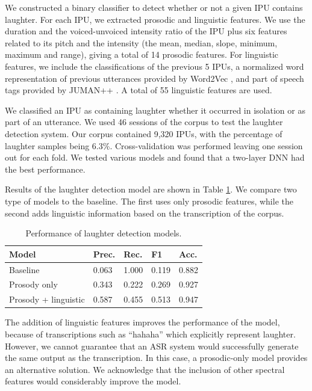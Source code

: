 \documentclass[letterpaper]{article} %
\begin{document}
We constructed a binary classifier to detect whether or not a given IPU contains laughter. For each IPU, we extracted prosodic and linguistic features. We use the duration and the voiced-unvoiced intensity ratio of the IPU plus six features related to its pitch and the intensity (the mean, median, slope, minimum, maximum and range), giving a total of 14 prosodic features. For linguistic features, we include the classifications of the previous 5 IPUs, a normalized word representation of previous utterances provided by Word2Vec \cite{Mikolov2013}, and part of speech tags provided by JUMAN++ \cite{Morita2015}. A total of 55 linguistic features are used.

We classified an IPU as containing laughter whether it occurred in isolation or as part of an utterance. We used 46 sessions of the corpus to test the laughter detection system. Our corpus contained 9,320 IPUs, with the percentage of laughter samples being 6.3\%. Cross-validation was performed leaving one session out for each fold. We tested various models and found that a two-layer DNN had the best performance.

Results of the laughter detection model are shown in Table \ref{laughresults}. We compare two type of models to the baseline. The first uses only prosodic features, while the second adds linguistic information based on the transcription of the corpus.

\begin{table}[h]
\begin{center}
\begin{tabular}{|l|l|l|l|l|}
\hline \bf Model & \bf Prec. & \bf Rec. & \bf F1 & \bf Acc. \\ \hline
Baseline & 0.063 & 1.000 & 0.119 & 0.882 \\
Prosody only & 0.343 & 0.222 & 0.269 &  0.927 \\
Prosody + linguistic & 0.587 & 0.455 & 0.513 & 0.947 \\
\hline
\end{tabular}
\end{center}
\caption{\label{laughresults} Performance of laughter detection models.}
\end{table}

The addition of linguistic features improves the performance of the model, because of transcriptions such as ``hahaha'' which explicitly represent laughter. However, we cannot guarantee that an ASR system would successfully generate the same output as the transcription. In this case, a prosodic-only model provides an alternative solution. We acknowledge that the inclusion of other spectral features would considerably improve the model.
\end{document}
